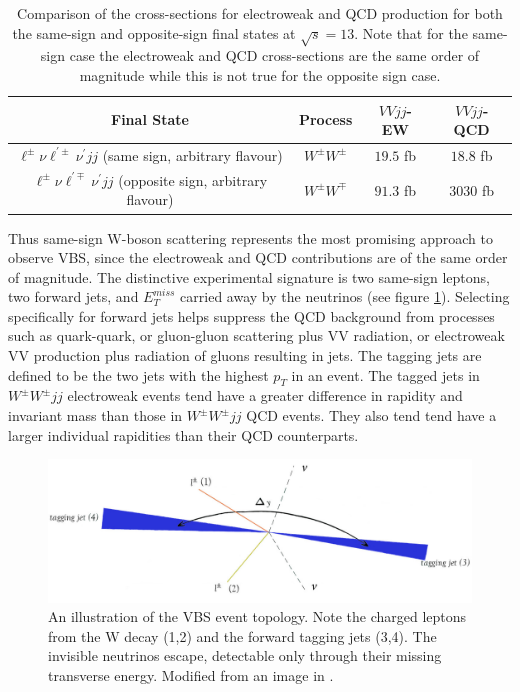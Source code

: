 \begin{table}
\centering
\begin{tabular}{c c c c}
\hline \hline
Final State & Process & $VVjj$-EW & $VVjj$-QCD \\ \hline 
$\ell^{\pm}\nu\ell^{'\pm}\nu^{'}jj$ (same sign, arbitrary flavour) & $W^{\pm}W^{\pm}$ & $19.5$ fb  & $18.8$ fb \\
$\ell^{\pm}\nu\ell^{'\mp}\nu^{'}jj$ (opposite sign, arbitrary flavour) & $W^{\pm}W^{\mp}$ & $91.3$ fb & $3030$ fb \\
\hline \hline
\end{tabular}
\caption{Comparison of the cross-sections for electroweak and QCD production for both the same-sign and opposite-sign final states at $\sqrt{s}=13$. Note that for the same-sign case the electroweak and QCD cross-sections are the same order of magnitude while this is not true for the opposite sign case. \cite{ssWW}}
\label{ss_vs_os}
\end{table}

Thus same-sign W-boson scattering represents the most promising approach to observe VBS, since the electroweak and QCD contributions are of the same order of magnitude. The distinctive experimental signature is two same-sign leptons, two forward jets, and $E_{T}^{miss}$ carried away by the neutrinos (see figure \ref{ssWW_topology}). Selecting specifically for forward jets helps suppress the QCD background from processes such as quark-quark, or gluon-gluon scattering plus VV radiation, or electroweak VV production plus radiation of gluons resulting in jets. The tagging jets are defined to be the two jets with the highest $p_{T}$ in an event. The tagged jets in $W^{\pm}W^{\pm}jj$ electroweak events tend have a greater difference in rapidity and invariant mass than those in $W^{\pm}W^{\pm}jj$ QCD events. They also tend tend have a larger individual rapidities than their QCD counterparts.

\begin{figure}
\centering
\includegraphics[width=1.0\textwidth]{images/ssWW/ssWW_topology.jpg}
\caption{An illustration of the VBS event topology. Note the charged leptons from the W decay (1,2) and the forward tagging jets (3,4). The invisible neutrinos escape, detectable only through their missing transverse energy. Modified from an image in \cite{ssWW_int_note}.}
\label{ssWW_topology}
\end{figure}

